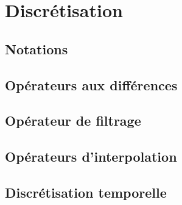 
\chapter{Discrétisation}

\section{Notations}


\section{Opérateurs aux différences}


\section{Opérateur de filtrage}


\section{Opérateurs d'interpolation}


\section{Discrétisation temporelle}
